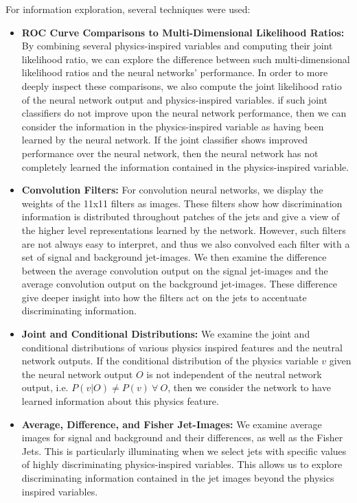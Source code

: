 For information exploration, several techniques were used:
\begin{itemize}

\item \textbf{ROC Curve Comparisons to Multi-Dimensional Likelihood Ratios:}  By combining several physics-inspired variables and computing their joint likelihood ratio, we can explore the difference between such multi-dimensional likelihood ratios and the neural networks' performance.  In order to more deeply inspect these comparisons, we also compute the joint likelihood ratio of the neural network output and physics-inspired variables.  if such joint classifiers do not improve upon the neural network performance, then we can consider the information in the physics-inspired variable as having been learned by the neural network.  If the joint classifier shows improved performance over the neural network, then the neural network has not completely learned the information contained in the physics-inspired variable.

\item \textbf{Convolution Filters:}  For convolution neural networks, we display the weights of the 11x11 filters as images.  These filters show how discrimination information is distributed throughout patches of the jets and give a view of the higher level representations learned by the network.  However, such filters are not always easy to interpret, and thus we also convolved each filter with a set of signal and background jet-images.  We then examine the difference between the average convolution output on the signal jet-images and the average convolution output on the background jet-images.  These difference give deeper insight into how the filters act on the jets to accentuate discriminating information.

\item \textbf{Joint and Conditional Distributions:}  We examine the joint and conditional distributions of various physics inspired features and the neutral network outputs.  If the conditional distribution of the physics variable $v$ given the neural network output $O$ is not independent of the neutral network output, i.e. $P(v|O) \neq P(v)\ \forall\ O$, then we consider the network to have learned information about this physics feature.

\item \textbf{Average, Difference, and Fisher Jet-Images:}  We examine average images for signal and background and their differences, as well as the Fisher Jets.  This is particularly illuminating when we select jets with specific values of highly discriminating physics-inspired variables.  This allows us to explore discriminating information contained in the jet images beyond the physics inspired variables.


\end{itemize}
